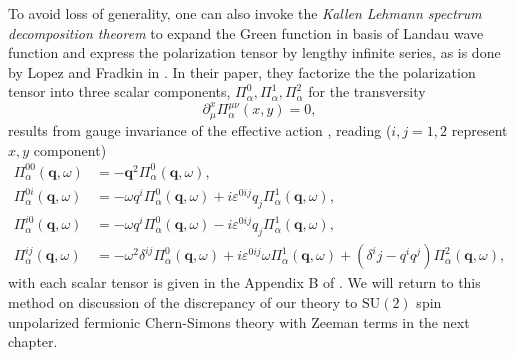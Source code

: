 \documentclass[bachelor,english,numbers]{ustcthesis}
\begin{document}
		To avoid loss of generality, one can also invoke the \emph{Kallen Lehmann spectrum decomposition theorem} \cite{abrikosov2012methods,peskin1995introduction} to expand the Green function in basis of Landau wave function and express the polarization tensor by lengthy infinite series, as is done by Lopez and Fradkin in \cite{lopez1991fractional}. In their paper, they factorize the the polarization tensor into three scalar components, $\Pi^0_\alpha, \Pi^1_\alpha, \Pi^2_\alpha$ for the transversity
		\begin{equation}\label{2.4.11}
			\partial_\mu^x\Pi^{\mu\nu}_\alpha(x,y)=0,
		\end{equation}
		results from gauge invariance of the effective action \cite{Fradkin2013Field}, reading ($i,j=1,2$ represent $x,y$ component)
		\begin{subequations}\label{2.4.12}
		\begin{align}
			\Pi_\alpha^{00}(\bm{q},\omega)&=-\bm{q}^2\Pi^0_\alpha(\bm{q},\omega),\label{2.4.12a}\\
			\Pi_\alpha^{0i}(\bm{q},\omega)&=-\omega q^i\Pi^0_\alpha(\bm{q},\omega)+i \varepsilon^{0ij}q_j\Pi^1_\alpha(\bm{q},\omega),\label{2.4.12b}\\
			\Pi_\alpha^{i0}(\bm{q},\omega)&=-\omega q^i\Pi^0_\alpha(\bm{q},\omega)-i \varepsilon^{0ij}q_j\Pi^1_\alpha(\bm{q},\omega),\label{2.4.12c}\\
			\Pi_\alpha^{ij}(\bm{q},\omega)&=-\omega^2\delta^{ij}\Pi^0_\alpha(\bm{q},\omega)+i \varepsilon^{0ij}\omega\Pi^1_\alpha(\bm{q},\omega)+(\delta^ij-q^iq^j)\Pi^2_\alpha(\bm{q},\omega),\label{2.4.12d}
		\end{align}
		\end{subequations}
		with each scalar tensor is given in the Appendix B of \cite{lopez1991fractional}. We will return to this method on discussion of the discrepancy of our theory to $\mathrm{SU}(2)$ spin unpolarized fermionic Chern-Simons theory with Zeeman terms in the next chapter.
\end{document}
